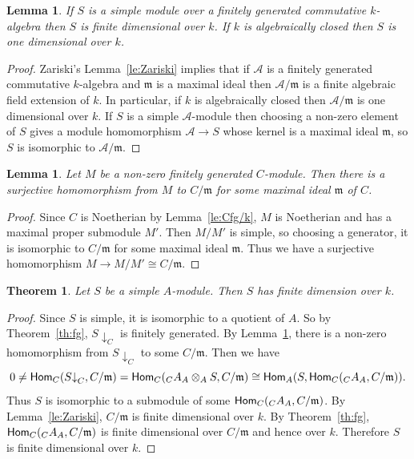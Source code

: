 \documentclass[12pt]{amsart}
\newcommand{\da}{\downarrow}
\newcommand{\Hom}{\operatorname{\sf Hom}}
\newcommand{\mcA}{\mathcal{A}}
\newcommand{\mfm}{\mathfrak{m}}
\numberwithin{equation}{section}
\newtheorem{theorem}[equation]{Theorem}
\newtheorem{lemma}[equation]{Lemma}
\theoremstyle{definition}
\begin{document}
\begin{lemma}
If $S$ is a simple module over a finitely generated commutative
$k$-algebra then $S$ is finite dimensional over $k$. If $k$ is
algebraically closed then $S$ is one dimensional over $k$.
\end{lemma}
\begin{proof}
Zariski's Lemma~\ref{le:Zariski} implies that if $\mcA$ is a finitely generated
commutative $k$-algebra and $\mfm$ is a maximal ideal then $\mcA/\mfm$ is
a finite algebraic field extension of $k$. In particular, if $k$ is
algebraically closed then $\mcA/\mfm$ is one dimensional over $k$.
If $S$ is a simple $\mcA$-module then choosing a non-zero element of $S$
gives a module homomorphism $\mcA\to S$ whose kernel is a maximal ideal $\mfm$,
so $S$ is isomorphic to $\mcA/\mfm$.
\end{proof}


\begin{lemma}\label{le:C/m}
Let $M$ be a non-zero finitely generated $C$-module. Then there is a surjective 
homomorphism from $M$ to $C/\mfm$ for some maximal ideal $\mfm$ of $C$. 
\end{lemma}
\begin{proof}
Since $C$ is Noetherian by Lemma~\ref{le:Cfg/k}, $M$ is Noetherian and has a
maximal proper submodule $M'$. Then $M/M'$ 
is simple, so choosing a generator, it is isomorphic to $C/\mfm$ for
some maximal ideal $\mfm$. Thus we have a surjective homomorphism $M
\to M/M' \cong C/\mfm$.
\end{proof}


\begin{theorem}
Let $S$ be a simple $A$-module. Then $S$ has finite dimension over
$k$. 
\end{theorem}
\begin{proof}
Since $S$ is simple, it is isomorphic to a quotient of $A$. So by
Theorem~\ref{th:fg}, $S{\da}_C$ is finitely generated.
By Lemma~\ref{le:C/m}, there is a non-zero homomorphism from
$S{\da}_C$ to some $C/\mfm$. Then we have
\[ 0 \ne \Hom_C(S{\da}_C,C/\mfm)= \Hom_C({_C}A_A\otimes_A S,C/\mfm)
\cong \Hom_A(S,\Hom_C({_C}A_A,C/\mfm)). \]
Thus $S$ is isomorphic to a submodule of some
$\Hom_C({_C}A_A,C/\mfm)$. By Lemma~\ref{le:Zariski}, $C/\mfm$ is
finite dimensional over $k$. 
By Theorem~\ref{th:fg}, $\Hom_C({_C}A_A,C/\mfm)$ is finite dimensional
over $C/\mfm$ and hence over $k$. Therefore 
 $S$ is finite dimensional over $k$.
\end{proof}
\end{document}
